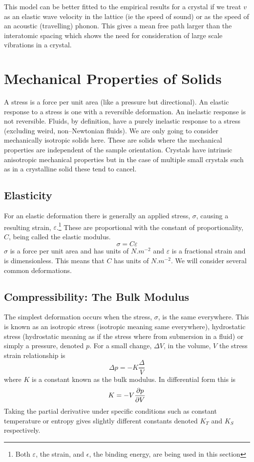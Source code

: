     This model can be better fitted to the empirical results for a crystal if we treat \(v\) as an elastic wave velocity in the lattice (ie the speed of sound) or as the speed of an acoustic (travelling) phonon.
    This gives a mean free path larger than the interatomic spacing which shows the need for consideration of large scale vibrations in a crystal.
    
    \section{Mechanical Properties of Solids}
    A stress is a force per unit area (like a pressure but directional).
    An elastic response to a stress is one with a reversible deformation.
    An inelastic response is not reversible.
    Fluids, by definition, have a purely inelastic response to a stress (excluding weird, non--Newtonian fluids).
    We are only going to consider mechanically isotropic solids here.
    These are solids where the mechanical properties are independent of the sample orientation.
    Crystals have intrinsic anisotropic mechanical properties but in the case of multiple small crystals such as in a crystalline solid these tend to cancel.
    
    \subsection{Elasticity}
    For an elastic deformation there is generally an applied stress, \(\sigma\), causing a resulting strain, \(\varepsilon\).\footnote{Both \(\varepsilon\), the strain, and \(\epsilon\), the binding energy, are being used in this section}
    These are proportional with the constant of proportionality, \(C\), being called the elastic modulus.
    \[\sigma = C\varepsilon\]
    \(\sigma\) is a force per unit area and has units of \(\si{N.m^{-2}}\) and \(\varepsilon\) is a fractional strain and is dimensionless.
    This means that \(C\) has units of \(\si{N.m^{-2}}\).
    We will consider several common deformations.
    
    \subsection{Compressibility: The Bulk Modulus}
    The simplest deformation occurs when the stress, \(\sigma\), is the same everywhere. 
    This is known as an isotropic stress (isotropic meaning same everywhere), hydrostatic stress (hydrostatic meaning as if the stress where from submersion in a fluid) or simply a pressure, denoted \(p\).
    For a small change, \(\Delta V\), in the volume, \(V\) the stress strain relationship is
    \[\Delta p = -K\frac{\Delta}{V}\]
    where \(K\) is a constant known as the bulk modulus.
    In differential form this is
    \[K = -V\pdv{p}{V}\]
    Taking the partial derivative under specific conditions such as constant temperature or entropy gives slightly different constants denoted \(K_T\) and \(K_S\) respectively.
    
